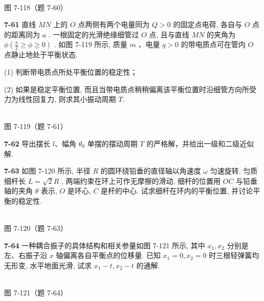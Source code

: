 \begin{center}
\resizebox{0.45\textwidth}{!}{}\\[4pt]
{\small 图 7-118（题 7-60）}
\end{center}

\newpage

\textbf{7-61} 直线 $MN$ 上的 $O$ 点两侧有两个电量同为 $Q > 0$ 的固定点电荷, 各自与 $O$ 点的距离同为 $a$ . 一根固定的光滑绝缘细管过 $O$ 点, 且与直线 $MN$ 的夹角为 $\phi \left(\frac{\pi}{2} \geqslant \phi \geqslant 0\right)$ . 如图 7-119 所示, 质量 $m$ 、电量 $q > 0$ 的带电质点可在管内 $O$ 点静止地处于平衡状态.

(1) 判断带电质点所处平衡位置的稳定性；

(2) 如果是稳定平衡位置, 而且当带电质点稍稍偏离该平衡位置时沿细管方向所受力为线性回复力, 则求其小振动周期 $T$.

\begin{center}
\resizebox{0.50\textwidth}{!}{}\\[4pt]
{\small 图 7-119（题 7-61）}
\end{center}

\newpage

\textbf{7-62} 导出摆长 $l$、幅角 $\theta_{0}$ 单摆的摆动周期 $T$ 的严格解，并给出一级和二级近似解.

\newpage

\textbf{7-63} 如图 7-120 所示, 半径 $R$ 的圆环绕铅垂的直径轴以角速度 $\omega$ 匀速旋转. 匀质细杆长 $L = \sqrt{2} R$ , 两端约束在环上可作无摩擦的滑动, 细杆的位置用 $OC$ 与铅垂轴的夹角 $\theta$ 表示, $O$ 是环心, $C$ 是杆的中心. 试求细杆在环内的平衡位置, 并讨论平衡的稳定性.

\begin{center}
\resizebox{0.50\textwidth}{!}{}\\[4pt]
{\small 图 7-120（题 7-63）}
\end{center}

\newpage

\textbf{7-64} 一种耦合振子的具体结构和相关参量如图 7-121 所示, 其中 $x_{1}, x_{2}$ 分别是左、右振子沿 $x$ 轴偏离各自平衡点的位移量. 已知 $x_1=0,x_2=0$ 时三根轻弹簧均无形变, 水平地面光滑, 试求 $x_{1} - t, x_{2} - t$ 的通解.

\begin{center}
\resizebox{0.50\textwidth}{!}{}\\[4pt]
{\small 图 7-121（题 7-64）}
\end{center}


